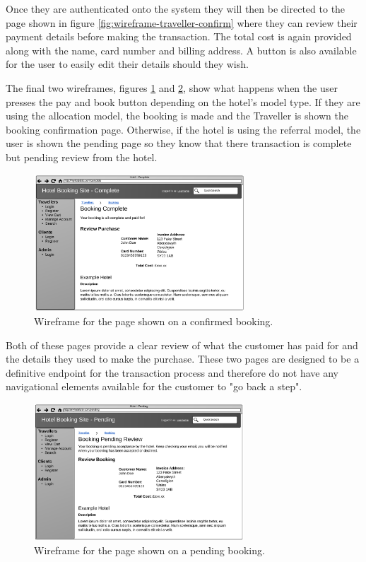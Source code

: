\documentclass{article}
\begin{document}
Once they are authenticated onto the system they will then be directed to the page shown in figure \ref{fig:wireframe-traveller-confirm} where they can review their payment details before making the transaction. The total cost is again provided along with the name, card number and billing address. A button is also available for the user to easily edit their details should they wish.

The final two wireframes, figures \ref{fig:wireframe-traveller-booked} and \ref{fig:wireframe-traveller-pending}, show what happens when the user presses the pay and book button depending on the hotel's model type. If they are using the allocation model, the booking is made and the Traveller is shown the booking confirmation page. Otherwise, if the hotel is using the referral model, the user is shown the pending page so they know that there transaction is complete but pending review from the hotel.

\begin{figure}[H]
\centering
\includegraphics[width=0.7\textwidth]{img/wireframes/Booked.png}
\caption{Wireframe for the page shown on a confirmed booking.}
\label{fig:wireframe-traveller-booked}
\end{figure}

Both of these pages provide a clear review of what the customer has paid for and the details they used to make the purchase. These two pages are designed to be a definitive endpoint for the transaction process and therefore do not have any navigational elements available for the customer to "go back a step".

\begin{figure}[H]
\centering
\includegraphics[width=0.7\textwidth]{img/wireframes/Pending.png}
\caption{Wireframe for the page shown on a pending booking.}
\label{fig:wireframe-traveller-pending}
\end{figure}
\end{document}
